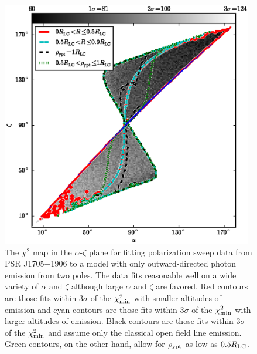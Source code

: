 \begin{figure}[t!!]
\begin{center}
\includegraphics[width=0.98\textwidth]{chapters/inwardDirectedPhotons/figures/mapB1702allForward.eps}
\caption[The $\chi^2$ map in the $\alpha$-$\zeta$ plane
for fitting polarization sweep data from PSR J1705$-$1906
to a model with only outward-directed photon emission
from two poles]{
The $\chi^2$ map in the $\alpha$-$\zeta$ plane 
for fitting polarization sweep data from PSR J1705$-$1906
to a model with only outward-directed photon emission
from two poles.  
The data fits reasonable well on a wide variety of 
$\alpha$ and $\zeta$ although large $\alpha$ and $\zeta$
are favored.  Red contours are those fits within
$3\sigma$ of the $\chi^2_{\rm{min}}$
with smaller altitudes of emission and
cyan contours are those fits within
$3\sigma$ of the $\chi^2_{\rm{min}}$ with larger 
altitudes of emission.
Black contours are those fits within
$3\sigma$ of the $\chi^2_{\rm{min}}$
and assume only the classical 
open field line emission.
Green contours, on the other hand, allow for
$\rho_{\rm{ypt}}$ as low as $0.5R_{\rm{LC}}$.
\label{fig:allForward}
}
\end{center}
\end{figure}

